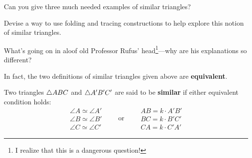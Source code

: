 \begin{ques} 
Can you give three much needed examples of similar triangles? 
\end{ques}
\QM

\begin{ques} 
Devise a way to use folding and tracing constructions to help explore this notion
of similar triangles.
\end{ques}
\QM



\begin{ques} 
What's going on in aloof old Professor Rufus' head\footnote{I realize that
this is a dangerous question!}---why are his explanations so different?
\end{ques}
\QM

In fact, the two definitions of similar triangles given
above are \textbf{equivalent}.


\begin{dfn} 
Two triangles $\triangle ABC$ and $\triangle A'B'C'$ are said to be
\textbf{similar} if either equivalent condition holds:
\[
\begin{array}{l}
\angle A \simeq \angle A'\\
\angle B \simeq \angle B' \\
\angle C \simeq \angle C'
\end{array}
\qquad\text{or}\qquad
\begin{array}{l}
AB = k\cdot A'B'\\
BC = k\cdot B'C' \\
CA = k\cdot C'A'
\end{array}
\]
\end{dfn}

